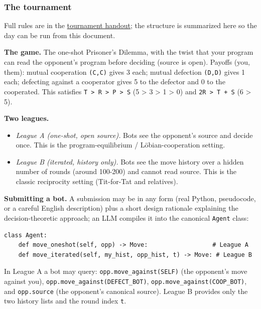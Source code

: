 \documentclass[11pt]{article}
\begin{document}
\subsubsection{The tournament}
Full rules are in the \href{https://iliad.au.pe/sessions/decision-theory/handout.html}{tournament handout}; the structure is summarized here so the day can be run from this document.

\textbf{The game.} The one-shot Prisoner's Dilemma, with the twist that your program can read the opponent's program before deciding (source is open). Payoffs (you, them): mutual cooperation \texttt{(C,C)} gives 3 each; mutual defection \texttt{(D,D)} gives 1 each; defecting against a cooperator gives 5 to the defector and 0 to the cooperated. This satisfies \texttt{T\ \textgreater{}\ R\ \textgreater{}\ P\ \textgreater{}\ S} (5 \textgreater{} 3 \textgreater{} 1 \textgreater{} 0) and \texttt{2R\ \textgreater{}\ T\ +\ S} (6 \textgreater{} 5).

\textbf{Two leagues.}

\begin{itemize}
\item
  \emph{League A (one-shot, open source).} Bots see the opponent's source and decide once. This is the program-equilibrium / Löbian-cooperation setting.
\item
  \emph{League B (iterated, history only).} Bots see the move history over a hidden number of rounds (around 100-200) and cannot read source. This is the classic reciprocity setting (Tit-for-Tat and relatives).
\end{itemize}

\textbf{Submitting a bot.} A submission may be in any form (real Python, pseudocode, or a careful English description) plus a short design rationale explaining the decision-theoretic approach; an LLM compiles it into the canonical \texttt{Agent} class:

\begin{verbatim}
class Agent:
    def move_oneshot(self, opp) -> Move:                  # League A
    def move_iterated(self, my_hist, opp_hist, t) -> Move: # League B
\end{verbatim}

In League A a bot may query: \texttt{opp.move\_against(SELF)} (the opponent's move against you), \texttt{opp.move\_against(DEFECT\_BOT)}, \texttt{opp.move\_against(COOP\_BOT)}, and \texttt{opp.source} (the opponent's canonical source). League B provides only the two history lists and the round index \texttt{t}.
\end{document}
